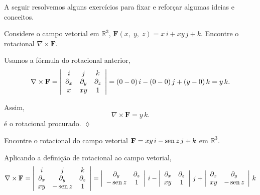 A seguir resolvemos alguns exercícios para fixar e reforçar algumas ideias e conceitos.
\begin{exc}
	Considere o campo vetorial em $\mathbb{R}^{3}$, \(\mathbf{F}(x,\; y,\; z) = x\, i + xy\, j + k\). Encontre o rotacional \(\nabla \times \mathbf{F}\).
\end{exc}

\solo
Usamos a fórmula do rotacional anterior,
\begin{equation*}
	\nabla \times \mathbf{F} =
	\left|\begin{array}[c]{ccc}
		i & j & k\\
		\partial_{x} & \partial_{y} & \partial_{z}\\
		x & xy & 1		
	\end{array}
	\right|	= (0-0)\, i - (0-0)\, j + (y-0)\, k= y\, k.
\end{equation*}

Assim,
\begin{equation*}
	\nabla \times \mathbf{F} = y\, k.
\end{equation*}
é o rotacional procurado. \hfill $\lozenge$


\begin{exc}
	Encontre o rotacional do campo vetorial  \(\mathbf{F}=xy\, i -\operatorname{sen} z\, j + k\) em $\mathbb{R}^{3}$.
\end{exc}

\solo
Aplicando a definição de rotacional ao campo vetorial,
\begin{equation*}
	\nabla \times \mathbf{F} =
	\left|\begin{array}[c]{ccc}
		i & j & k\\
		\partial_{x} & \partial_{y} & \partial_{z}\\
		xy & -\operatorname{sen} z & 1		
	\end{array}
	\right|	= \left|\begin{array}{cc}
		\partial_{y} & \partial_{z}\\
		-\operatorname{sen} z & 1
	\end{array} \right|\, i - \left|\begin{array}{cc}
		\partial_{x} & \partial_{z}\\
		xy & 1
	\end{array} \right|\, j + \left|\begin{array}{cc}
		\partial_{x} & \partial_{y}\\
		xy & -\operatorname{sen} z
	\end{array} \right|\, k
\end{equation*}

